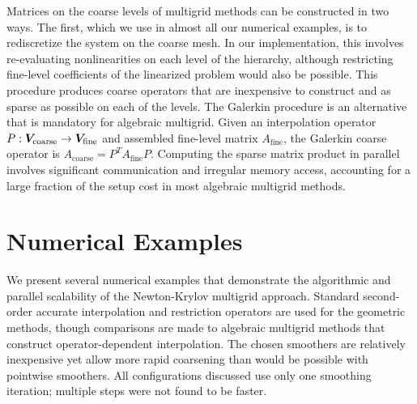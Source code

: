 Matrices on the coarse levels of multigrid methods can be constructed in two ways.
The first, which we use in almost all our numerical examples, is to rediscretize the system on the coarse mesh.
In our implementation, this involves re-evaluating nonlinearities on each level of the hierarchy, although restricting fine-level coefficients of the linearized problem would also be possible.
This procedure produces coarse operators that are inexpensive to construct and as sparse as possible on each of the levels.
The Galerkin procedure is an alternative that is mandatory for algebraic multigrid.
Given an interpolation operator $P: \bm V_{\text{coarse}} \to \bm V_{\text{fine}}$ and assembled fine-level matrix $A_{\text{fine}}$, the Galerkin coarse operator is $A_{\text{coarse}} = P^T A_{\text{fine}} P$.
Computing the sparse matrix product in parallel involves significant communication and irregular memory access, accounting for a large fraction of the setup cost in most algebraic multigrid methods.

\section{Numerical Examples}\label{sec:hstatexamples}

We present several numerical examples that demonstrate the algorithmic and parallel scalability of the Newton-Krylov multigrid approach.
Standard second-order accurate interpolation and restriction operators are used for the geometric methods, though comparisons are made to algebraic multigrid methods that construct operator-dependent interpolation.
The chosen smoothers are relatively inexpensive yet allow more rapid coarsening than would be possible with pointwise smoothers.
All configurations discussed use only one smoothing iteration; multiple steps were not found to be faster.

